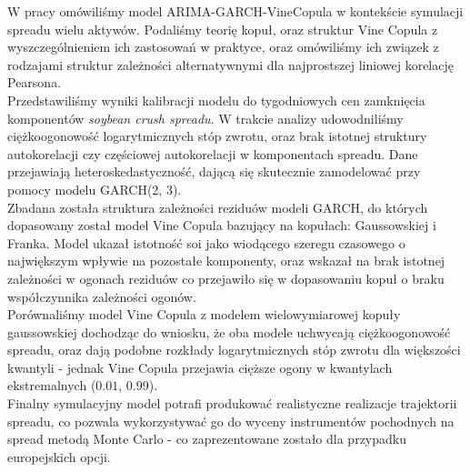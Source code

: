 \begin{wstep}[Wnioski]    %
	W pracy omówiliśmy model ARIMA-GARCH-VineCopula w kontekście symulacji spreadu wielu aktywów. Podaliśmy teorię kopuł, oraz struktur Vine Copula z wyszczególnieniem ich zastosowań w praktyce, oraz omówiliśmy ich związek z rodzajami struktur zależności alternatywnymi dla najprostszej liniowej korelację Pearsona.\\
	Przedstawiliśmy wyniki kalibracji modelu do tygodniowych cen zamknięcia komponentów \emph{soybean crush spreadu}. W trakcie analizy udowodniliśmy ciężkoogonowość logarytmicznych stóp zwrotu, oraz brak istotnej struktury autokorelacji czy częściowej autokorelacji w komponentach spreadu. Dane przejawiają heteroskedastyczność, dającą się skutecznie zamodelować przy pomocy modelu GARCH(2, 3).\\
	Zbadana została struktura zależności reziduów modeli GARCH, do których dopasowany został model Vine Copula bazujący na kopułach: Gaussowskiej i Franka. Model ukazał istotność soi jako wiodącego szeregu czasowego o największym wpływie na pozostałe komponenty, oraz wskazał na brak istotnej zależności w ogonach reziduów co przejawiło się w dopasowaniu kopuł o braku współczynnika zależności ogonów.\\
	Porównaliśmy model Vine Copula z modelem wielowymiarowej kopuły gaussowskiej dochodząc do wniosku, że oba modele uchwycają ciężkoogonowość spreadu, oraz dają podobne rozkłady logarytmicznych stóp zwrotu dla większości kwantyli - jednak Vine Copula przejawia cięższe ogony w kwantylach ekstremalnych ($0.01$, $0.99$).\\
	Finalny symulacyjny model potrafi produkować realistyczne realizacje trajektorii spreadu, co pozwala wykorzystywać go do wyceny instrumentów pochodnych na spread metodą Monte Carlo - co zaprezentowane zostało dla przypadku europejskich opcji.
	
\end{wstep}
